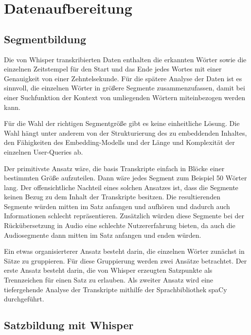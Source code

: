 \section{Datenaufbereitung}

\subsection{Segmentbildung}

Die von Whisper transkribierten Daten enthalten die erkannten Wörter sowie die einzelnen Zeitstempel für den Start und das Ende jedes Wortes mit einer Genauigkeit von einer Zehntelsekunde.
Für die spätere Analyse der Daten ist es sinnvoll, die einzelnen Wörter in größere Segmente zusammenzufassen, damit bei einer Suchfunktion der Kontext von umliegenden Wörtern miteinbezogen werden kann.

Für die Wahl der richtigen Segmentgröße gibt es keine einheitliche Lösung.
Die Wahl hängt unter anderem von der Strukturierung des zu embeddenden Inhaltes, den Fähigkeiten des Embedding-Modells und der Länge und Komplexität der einzelnen User-Queries ab.

Der primitivste Ansatz wäre, die basis Transkripte einfach in Blöcke einer bestimmten Größe aufzuteilen.
Dann wäre jedes Segment zum Beispiel 50 Wörter lang.
Der offensichtliche Nachteil eines solchen Ansatzes ist, dass die Segmente keinen Bezug zu dem Inhalt der Transkripte besitzen.
Die resultierenden Segmente würden mitten im Satz anfangen und aufhören und dadurch auch Informationen schlecht repräsentieren.
Zusätzlich würden diese Segmente bei der Rückübersetzung in Audio eine schlechte Nutzererfahrung bieten, da auch die Audiosegmente dann mitten im Satz anfangen und enden würden.

Ein etwas organisierterer Ansatz besteht darin, die einzelnen Wörter zunächst in Sätze zu gruppieren.
Für diese Gruppierung werden zwei Ansätze betrachtet.
Der erste Ansatz besteht darin, die von Whisper erzeugten Satzpunkte als Trennzeichen für einen Satz zu erlauben.
Als zweiter Ansatz wird eine tiefergehende Analyse der Transkripte mithilfe der Sprachbibliothek spaCy durchgeführt.

\subsection{Satzbildung mit Whisper}

